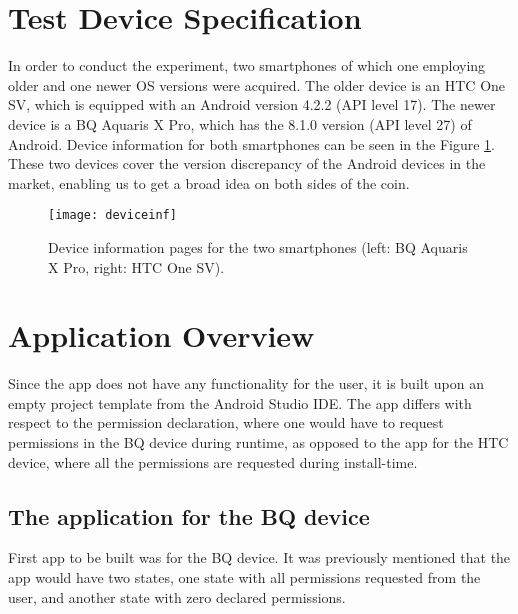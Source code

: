 \documentclass[
  a4paper,  %
  twoside,  %
  bibliography=totoc,
  headsepline,
  cleardoublepage=empty,
  parskip=half,
  draft=false,
  open=any
]{scrbook}
\begin{document}
\section{Test Device Specification}
In order to conduct the experiment, two smartphones of which one employing older and one newer OS versions were acquired. The older device is an HTC One SV, which is equipped with an Android version 4.2.2 (API level 17). The newer device is a BQ Aquaris X Pro, which has the 8.1.0 version (API level  27) of Android. Device information for both smartphones can be seen in the Figure \ref{devinf}. These two devices cover the version discrepancy of the Android devices in the market, enabling us to get a broad idea on both sides of the coin.
\begin{figure}\centering
	\texttt{[image: deviceinf]}
	\caption{Device information pages for the two smartphones (left: BQ Aquaris X Pro, right: HTC One SV).}
	\label{devinf}
\end{figure} 

\section{Application Overview}
Since the app does not have any functionality for the user, it is built upon an empty project template from the Android Studio IDE. The app differs with respect to the permission declaration, where one would have to request permissions in the BQ device during runtime, as opposed to the app for the HTC device, where all the permissions are requested during install-time. 

\subsection{The application for the BQ device}
First app to be built was for the BQ device. It was previously mentioned that the app would have two states, one state with all permissions requested from the user, and another state with zero declared permissions.
\end{document}
